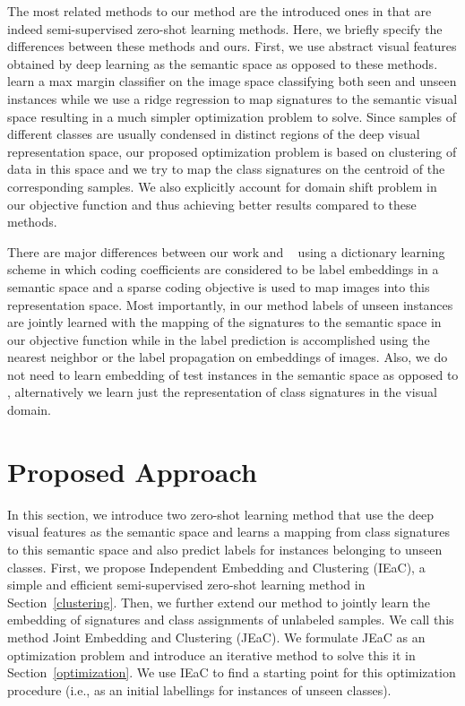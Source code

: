\documentclass[letterpaper]{article}
\begin{document}
The most related methods to our method are the introduced ones in \cite{li15max,Kodirov2015,semi15}
 that are indeed semi-supervised zero-shot learning methods. Here, we briefly specify the differences between these methods and ours. First, we use abstract visual features obtained by deep learning as the semantic space as opposed to these methods. \cite{li15max,semi15}
learn a max margin classifier on the image space classifying both seen and unseen instances while we use a ridge regression to map signatures to the semantic visual space resulting in a much simpler optimization problem to solve. Since samples of different classes are usually condensed in distinct regions of the deep visual representation space, our proposed optimization problem is based on clustering of data in this space and we try to map the class signatures on the centroid of the corresponding samples. We also explicitly account for domain shift problem in our objective function and thus achieving better results compared to these methods.

There are major differences between our work and ~\cite{Kodirov2015} using a dictionary learning scheme
in which coding coefficients are considered to be label embeddings in a semantic space
and a sparse coding objective is used to map images into this representation space.
Most importantly, in our method labels of unseen instances are jointly learned
with the mapping of the signatures to the semantic space in our objective function while in \cite{Kodirov2015}
the label prediction is accomplished using the nearest neighbor or the label propagation on embeddings of images.
Also, we do not need to learn embedding of test instances in the semantic space as opposed to \cite{Kodirov2015},
alternatively we learn just the representation of class signatures in the visual domain.

\section{Proposed Approach} \label{proposed}
In this section, we introduce two zero-shot learning method that use the deep visual features as the semantic space and learns
a mapping from class signatures to this semantic space and also predict labels for instances belonging to unseen classes.
 First, we propose Independent Embedding and Clustering (IEaC), a simple and efficient semi-supervised zero-shot learning method in Section~\ref{clustering}.
Then, we further extend our method to jointly learn the embedding of signatures and class assignments of unlabeled samples.
We call this method Joint Embedding and Clustering (JEaC). We formulate JEaC as an optimization problem and
 introduce an iterative method to solve this it in Section~\ref{optimization}.
 We use IEaC to find a starting point for this optimization procedure (i.e., as an initial labellings for instances of unseen classes).
\end{document}
